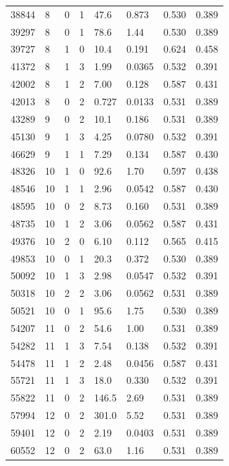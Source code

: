 \documentclass[preview]{standalone}
\begin{document}
{{{\begin{tabular}{L{1.2cm}C{1.2cm} C{0.3cm}C{0.5cm} C{1.4cm}C{1.4cm} C{1.4cm}C{1.4cm}}
  38844  &     8  & 0     &  1 &  47.6  & 0.873  & 0.530 &  0.389   \\ 
  39297  &     8  & 0     &  1 &  78.6  & 1.44  & 0.530 &  0.389   \\ 
  39727  &     8  & 1     &  0 &  10.4  & 0.191  & 0.624 &  0.458   \\ 
  41372  &     8  & 1     &  3 &  1.99  & 0.0365  & 0.532 &  0.391   \\ 
  42002  &     8  & 1     &  2 &  7.00  & 0.128  & 0.587 &  0.431   \\ 
  42013  &     8  & 0     &  2 &  0.727  & 0.0133  & 0.531 &  0.389   \\ 
  43289  &     9  & 0     &  2 &  10.1  & 0.186  & 0.531 &  0.389   \\ 
  45130  &     9  & 1     &  3 &  4.25  & 0.0780  & 0.532 &  0.391   \\ 
  46629  &     9  & 1     &  1 &  7.29  & 0.134  & 0.587 &  0.430   \\ 
  48326  &    10  & 1     &  0 &  92.6  & 1.70  & 0.597 &  0.438   \\ 
  48546  &    10  & 1     &  1 &  2.96  & 0.0542  & 0.587 &  0.430   \\ 
  48595  &    10  & 0     &  2 &  8.73  & 0.160  & 0.531 &  0.389   \\ 
  48735  &    10  & 1     &  2 &  3.06  & 0.0562  & 0.587 &  0.431   \\ 
  49376  &    10  & 2     &  0 &  6.10  & 0.112  & 0.565 &  0.415   \\ 
  49853  &    10  & 0     &  1 &  20.3  & 0.372  & 0.530 &  0.389   \\ 
  50092  &    10  & 1     &  3 &  2.98  & 0.0547  & 0.532 &  0.391   \\ 
  50318  &    10  & 2     &  2 &  3.06  & 0.0562  & 0.531 &  0.389   \\ 
  50521  &    10  & 0     &  1 &  95.6  & 1.75  & 0.530 &  0.389   \\ 
  54207  &    11  & 0     &  2 &  54.6  & 1.00  & 0.531 &  0.389   \\ 
  54282  &    11  & 1     &  3 &  7.54  & 0.138  & 0.532 &  0.391   \\ 
  54478  &    11  & 1     &  2 &  2.48  & 0.0456  & 0.587 &  0.431   \\ 
  55721  &    11  & 1     &  3 &  18.0  & 0.330  & 0.532 &  0.391   \\ 
  55822  &    11  & 0     &  2 &  146.5  & 2.69  & 0.531 &  0.389   \\ 
  57994  &    12  & 0     &  2 &  301.0  & 5.52  & 0.531 &  0.389   \\ 
  59401  &    12  & 0     &  2 &  2.19  & 0.0403  & 0.531 &  0.389   \\ 
  60552  &    12  & 0     &  2 &  63.0  & 1.16  & 0.531 &  0.389   \\ 
\hline 
\end{tabular} 

}}}
\end{document}
